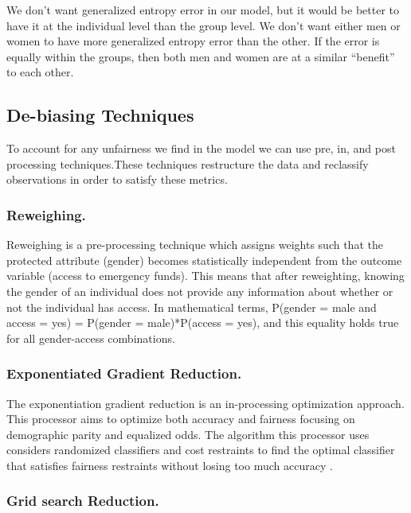 \documentclass[water,article,submit,moreauthors,pdftex]{mdpi}
\begin{document}
We don't want generalized entropy error in our model, but it would be
better to have it at the individual level than the group level. We don't
want either men or women to have more generalized entropy error than the
other. If the error is equally within the groups, then both men and
women are at a similar ``benefit'' to each other.

\hypertarget{de-biasing-techniques}{%
\subsection{De-biasing Techniques}\label{de-biasing-techniques}}

To account for any unfairness we find in the model we can use pre, in,
and post processing techniques.These techniques restructure the data and
reclassify observations in order to satisfy these metrics.

\hypertarget{reweighing.}{%
\subsubsection{Reweighing.}\label{reweighing.}}

Reweighing is a pre-processing technique which assigns weights such that
the protected attribute (gender) becomes statistically independent from
the outcome variable (access to emergency funds). This means that after
reweighting, knowing the gender of an individual does not provide any
information about whether or not the individual has access. In
mathematical terms, P(gender = male and access = yes) = P(gender =
male)*P(access = yes), and this equality holds true for all
gender-access combinations.

\hypertarget{exponentiated-gradient-reduction.}{%
\subsubsection{Exponentiated Gradient
Reduction.}\label{exponentiated-gradient-reduction.}}

The exponentiation gradient reduction is an in-processing optimization
approach. This processor aims to optimize both accuracy and fairness
focusing on demographic parity and equalized odds. The algorithm this
processor uses considers randomized classifiers and cost restraints to
find the optimal classifier that satisfies fairness restraints without
losing too much accuracy \citep{agarwal2018reductions}.

\hypertarget{grid-search-reduction.}{%
\subsubsection{Grid search Reduction.}\label{grid-search-reduction.}}
\end{document}
